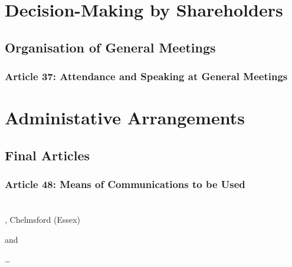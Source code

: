 \documentclass[letterpaper,10pt,openany,oneside,english]{sphinxmanual}
\begin{document}
\chapter{Decision-Making by Shareholders}
\label{\detokenize{decisionmaking:decision-making-by-shareholders}}\label{\detokenize{decisionmaking::doc}}

\section{Organisation of General Meetings}
\label{\detokenize{decisionmaking:organisation-of-general-meetings}}

\subsection{Article 37: Attendance and Speaking at General Meetings}
\label{\detokenize{decisionmaking:article-37-attendance-and-speaking-at-general-meetings}}

\chapter{Administative Arrangements}
\label{\detokenize{administrativearrangements:administative-arrangements}}\label{\detokenize{administrativearrangements::doc}}

\section{Final Articles}
\label{\detokenize{administrativearrangements:final-articles}}

\subsection{Article 48: Means of Communications to be Used}
\label{\detokenize{administrativearrangements:article-48-means-of-communications-to-be-used}}

\chapter{}
\label{\detokenize{index:document-author-s}}
, Chelmsford (Essex)

and

 …



\renewcommand{\indexname}{Index}
\printindex
\end{document}
